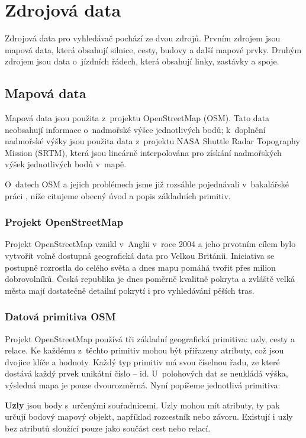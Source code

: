 \chapter{Zdrojová data}
\label{ch:zdrojova-data}

Zdrojová data pro vyhledávač pochází ze dvou zdrojů. Prvním zdrojem jsou mapová
data, která obsahují silnice, cesty, budovy a další mapové prvky. Druhým zdrojem
jsou data o~jízdních řádech, která obsahují linky, zastávky a spoje.

\section{Mapová data}
Mapová data jsou použita z~projektu OpenStreetMap \cite{OSM} (OSM). Tato data neobsahují
informace o~nadmořské výšce jednotlivých bodů; k~doplnění nadmořské výšky jsou
použita data z~projektu NASA Shuttle Radar Topography Mission (SRTM), která jsou
lineárně interpolována pro získání nadmořských výšek jednotlivých bodů v~mapě.

O~datech OSM a jejich problémech jsme již rozsáhle pojednávali v~bakalářské
práci \cite{bakalarka}, níže citujeme obecný úvod a popis základních primitiv. 
\newcommand{\tuc}{\bf}
\subsection{Projekt OpenStreetMap}
Projekt OpenStreetMap \cite{OSM} vznikl v~Anglii v~roce 2004 a jeho prvotním cílem bylo
vytvořit volně dostupná geografická data pro Velkou Británii. Iniciativa se
postupně rozrostla do celého světa a dnes mapu pomáhá tvořit přes milion
dobrovolníků. Česká republika je dnes poměrně kvalitně pokryta a zvláště velká
města mají dostatečně detailní pokrytí i pro vyhledávání pěších tras.

\subsection{Datová primitiva OSM} 
Projekt OpenStreetMap používá tři základní geografická primitiva: uzly, cesty a
relace. Ke každému z~těchto primitiv mohou být přiřazeny atributy, což jsou
dvojice klíče a hodnoty. Každý typ primitiv má svou číselnou řadu, ze které
dostává každý prvek unikátní číslo -- id. 
U~polohových dat se neukládá výška, výsledná mapa je pouze dvourozměrná.
Nyní popíšeme jednotlivá primitiva:

{\tuc Uzly} jsou body s~určenými souřadnicemi. Uzly mohou mít atributy, ty pak
určují bodový mapový objekt, například rozcestník nebo závoru. Existují i uzly
bez atributů sloužící pouze jako součást cest nebo relací.

